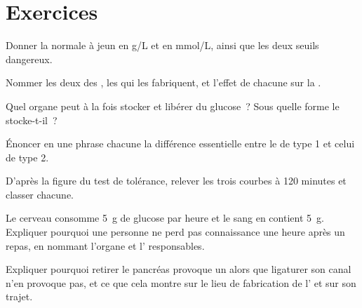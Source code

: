 \section{Exercices}

\begin{exercise}[$\star$]\label{exo:g12:glucose-and-diabetes:1}
Donner la  normale à jeun en \unit{g/L} et en \unit{mmol/L},
ainsi que les deux seuils dangereux.
\end{exercise}

\begin{exercise}[$\star$]\label{exo:g12:glucose-and-diabetes:2}
Nommer les deux  des , les  qui les fabriquent,
et l'effet de chacune sur la .
\end{exercise}

\begin{exercise}[$\star$]\label{exo:g12:glucose-and-diabetes:3}
Quel organe peut à la fois stocker et libérer du glucose~? Sous quelle
forme le stocke-t-il~?
\end{exercise}

\begin{exercise}[$\star$]\label{exo:g12:glucose-and-diabetes:4}
Énoncer en une phrase chacune la différence essentielle entre le
 de type 1 et celui de type 2.
\end{exercise}

\begin{exercise}[$\star$]\label{exo:g12:glucose-and-diabetes:5}
D'après la figure du test de tolérance, relever les trois courbes à
120 minutes et classer chacune.
\end{exercise}

\begin{exercise}[$\star\star$]\label{exo:g12:glucose-and-diabetes:6}
Le cerveau consomme \qty{5}{g} de glucose par heure et le sang en
contient \qty{5}{g}. Expliquer pourquoi une personne ne perd pas
connaissance une heure après un repas, en nommant l'organe et
l' responsables.
\end{exercise}

\begin{exercise}[$\star\star$]\label{exo:g12:glucose-and-diabetes:7}
Expliquer pourquoi retirer le pancréas provoque un  alors que
ligaturer son canal n'en provoque pas, et ce que cela montre sur le
lieu de fabrication de l' et sur son trajet.
\end{exercise}

